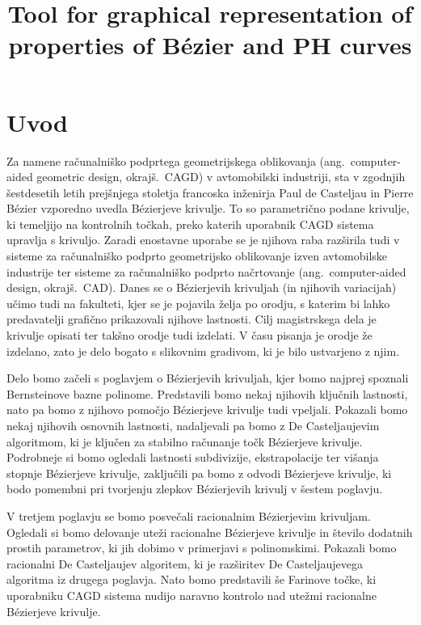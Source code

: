 \documentclass[isrm2, tisk]{fmfdelo}
\title{Tool for graphical representation of properties of Bézier and PH curves}
\begin{document}
    \section{Uvod}
    Za namene računalniško podprtega geometrijskega oblikovanja (ang.\ computer-aided geometric design, okrajš.\ CAGD) v avtomobilski industriji, sta v zgodnjih šestdesetih letih prejšnjega stoletja francoska inženirja Paul de Casteljau in Pierre Bézier vzporedno uvedla Bézierjeve krivulje.
    To so parametrično podane krivulje, ki temeljijo na kontrolnih točkah, preko katerih uporabnik CAGD sistema upravlja s krivuljo.
    Zaradi enostavne uporabe se je njihova raba razširila tudi v sisteme za računalniško podprto geometrijsko oblikovanje izven avtomobilske industrije ter sisteme za računalniško podprto načrtovanje (ang.\ computer-aided design, okrajš.\ CAD).
    Danes se o Bézierjevih krivuljah (in njihovih variacijah) učimo tudi na fakulteti, kjer se je pojavila želja po orodju, s katerim bi lahko predavatelji grafično prikazovali njihove lastnosti.
    Cilj magistrskega dela je krivulje opisati ter takšno orodje tudi izdelati.
    V času pisanja je orodje že izdelano, zato je delo bogato s slikovnim gradivom, ki je bilo ustvarjeno z njim.

    Delo bomo začeli s poglavjem o Bézierjevih krivuljah, kjer bomo najprej spoznali Bernsteinove bazne polinome.
    Predstavili bomo nekaj njihovih ključnih lastnosti, nato pa bomo z njihovo pomočjo Bézierjeve krivulje tudi vpeljali.
    Pokazali bomo nekaj njihovih osnovnih lastnosti, nadaljevali pa bomo z De Casteljaujevim algoritmom, ki je ključen za stabilno računanje točk Bézierjeve krivulje.
    Podrobneje si bomo ogledali lastnosti subdivizije, ekstrapolacije ter višanja stopnje Bézierjeve krivulje, zaključili pa bomo z odvodi Bézierjeve krivulje, ki bodo pomembni pri tvorjenju zlepkov Bézierjevih krivulj v šestem poglavju.

    V tretjem poglavju se bomo posvečali racionalnim Bézierjevim krivuljam.
    Ogledali si bomo delovanje uteži racionalne Bézierjeve krivulje in število dodatnih prostih parametrov, ki jih dobimo v primerjavi s polinomskimi.
    Pokazali bomo racionalni De Casteljaujev algoritem, ki je razširitev De Casteljaujevega algoritma iz drugega poglavja.
    Nato bomo predstavili še Farinove točke, ki uporabniku CAGD sistema nudijo naravno kontrolo nad utežmi racionalne Bézierjeve krivulje.
\end{document}
